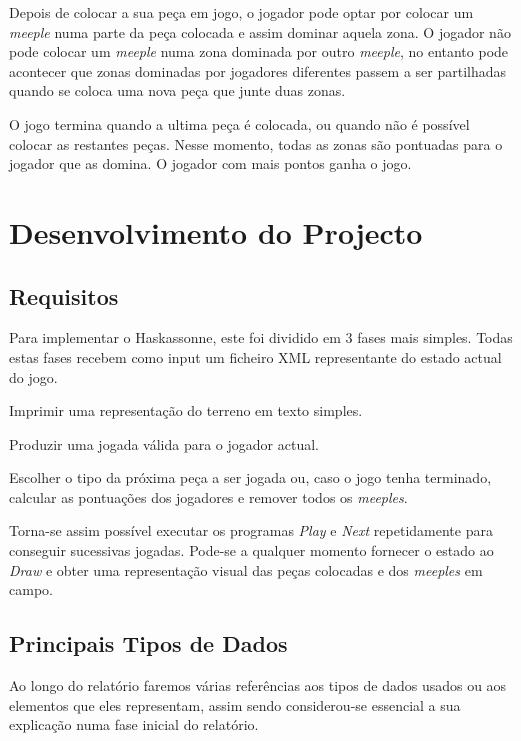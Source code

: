 \documentclass[11pt, a4paper, twoside]{article}
\begin{document}
Depois de colocar a sua peça em jogo, o jogador pode optar por colocar um \textit{meeple} numa parte da peça colocada e assim dominar aquela zona. O jogador não pode colocar um \textit{meeple} numa zona dominada por outro \textit{meeple}, no entanto pode acontecer que zonas dominadas por jogadores diferentes passem a ser partilhadas quando se coloca uma nova peça que junte duas zonas.

O jogo termina quando a ultima peça é colocada, ou quando não é possível colocar as restantes peças. Nesse momento, todas as zonas são pontuadas para o jogador que as domina. O jogador com mais pontos ganha o jogo.

\newpage
\section{Desenvolvimento do Projecto}

\subsection{Requisitos}

Para implementar o Haskassonne, este foi dividido em 3 fases mais simples.
Todas estas fases recebem como input um ficheiro XML representante do estado actual do jogo.

\begin{description}[style=multiline,leftmargin=1.5cm,font=\bfseries]
    \item[Draw] Imprimir uma representação do terreno em texto simples.
    \item[Play] Produzir uma jogada válida para o jogador actual.
    \item[Next] Escolher o tipo da próxima peça a ser jogada ou, caso o jogo tenha terminado, calcular as pontuações dos jogadores e remover todos os \textit{meeples}.
\end{description}

Torna-se assim possível executar os programas \textit{Play} e \textit{Next} repetidamente para conseguir sucessivas jogadas. Pode-se a qualquer momento fornecer o estado ao \textit{Draw} e obter uma representação visual das peças colocadas e dos \textit{meeples} em campo.

\subsection{Principais Tipos de Dados}

Ao longo do relatório faremos várias referências aos tipos de dados usados ou aos elementos que eles representam, assim sendo considerou-se essencial a sua explicação numa fase inicial do relatório.
\end{document}
